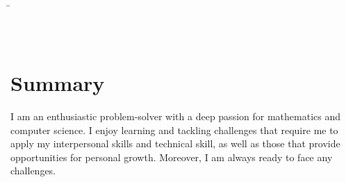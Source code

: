 \documentclass[a4paper, 9pt]{article}
\begin{document}
\fontsize{8}{10}\selectfont
\color{default}
\par\smallskip
\begin{minipage}[H][0.8cm][t]{\dimexpr\linewidth}
	\begin{tabbing}
		\hspace{10cm}\=\kill
		\> \\
		 \>  \\
		\> \\
	\end{tabbing}
\end{minipage}


\section{Summary}
I am an enthusiastic problem-solver with a deep passion for mathematics and computer science. I enjoy learning and tackling challenges that require me to apply my interpersonal skills and technical skill, as well as those that provide opportunities for personal growth. Moreover, I am always ready to face any challenges.
\end{document}
